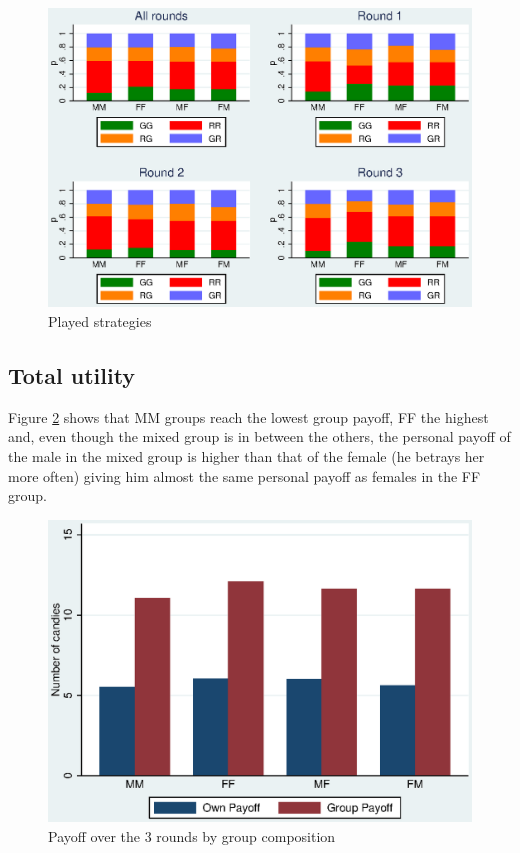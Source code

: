 \documentclass{article} %
\begin{document}
\begin{figure}[H]
\centering
\includegraphics[scale=1]{inc/roundBar.eps}
\caption{Played strategies}
\label{fig:roundBar}
\end{figure}

\subsection{Total utility}
Figure \ref{fig:totalPayoff} shows that MM groups reach the lowest group payoff, FF the highest and, even though the mixed group is in between the others, the personal payoff of the male in the mixed group is higher than that of the female (he betrays her more often) giving him almost the same personal payoff as females in the FF group.
\begin{figure}[H]
\centering
\includegraphics[scale=.7]{inc/totalPayoff.eps}
\caption{Payoff over the 3 rounds by group composition}
\label{fig:totalPayoff}
\end{figure}
\end{document}
